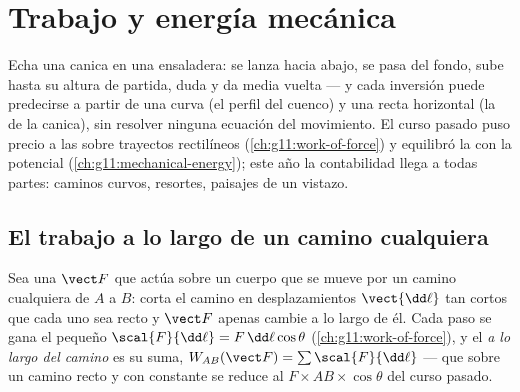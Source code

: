 \chapter{Trabajo y energía mecánica}\label{ch:g12:work-and-energy}

Echa una canica en una ensaladera: se lanza hacia abajo, se pasa del fondo, sube hasta
su altura de partida, duda y da media vuelta --- y cada inversión puede predecirse a
partir de una curva (el perfil del cuenco) y una recta horizontal (la  de la
canica), sin resolver ninguna ecuación del movimiento. El curso pasado puso precio a
las  sobre trayectos rectilíneos (\cref{ch:g11:work-of-force}) y equilibró la
 con la potencial (\cref{ch:g11:mechanical-energy}); este año la
contabilidad llega a todas partes: caminos curvos, resortes, paisajes de un vistazo.

\section{El trabajo a lo largo de un camino cualquiera}

\begin{definition}\label{def:g12:work-and-energy:path}
Sea una  $\vect F$ que actúa sobre un cuerpo que se mueve por un camino
cualquiera de $A$ a $B$: corta el camino en desplazamientos $\vect{\dd\ell}$ tan
cortos que cada uno sea recto y $\vect F$ apenas cambie a lo largo de él. Cada paso se
gana el pequeño  $\scal{F}{\dd\ell} = F\,\dd\ell\cos\theta$
(\cref{ch:g11:work-of-force}), y el \emph{ a lo largo del camino}%
 es su suma,
$W_{AB}(\vect F) = \sum \scal{F}{\dd\ell}$ --- que sobre un camino recto y con 
constante se reduce al $F \times AB \times \cos\theta$ del curso pasado.
\end{definition}

